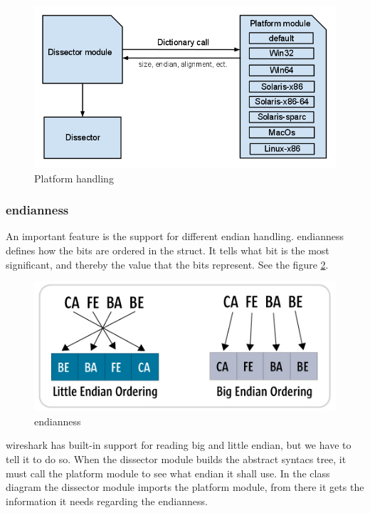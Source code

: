 \begin{figure}[!htb]
	\includegraphics[width=\textwidth]{./sprints/img/platformhandling}
	\caption{Platform handling\label{fig:platformhandling}}
\end{figure}

\subsubsection{\Gls{endianness}}
An important feature is the support for different \gls{endian} handling. \Gls{endianness} defines how the bits are ordered in the \gls{struct}. It tells what bit is the most significant, and thereby the value that the bits represent. See the figure \ref{fig:endianness}.
\begin{figure}[!htb]
	\includegraphics[width=\textwidth]{./sprints/img/endianness}
	\caption{\Gls{endianness}\label{fig:endianness}}
\end{figure}
\Gls{wireshark} has built-in support for reading big and little \gls{endian}, but we have to tell it to do so. When the \gls{dissector} module builds the abstract syntacs tree, it must call the platform module to see what \gls{endian} it shall use. In the class diagram the \gls{dissector} module imports the platform module, from there it gets the information it needs regarding the \gls{endianness}. 

